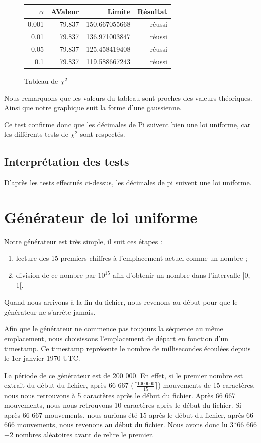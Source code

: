 \documentclass[10pt,a4paper]{article}
\begin{document}
\begin{figure}[h]
		\centering
\begin{tabular}{|r|r|r|r|}
\hline
$\alpha$ & AValeur & Limite & Résultat\\
\hline
0.001 & 79.837 & 150.667055668 & réussi\\
0.01 & 79.837 & 136.971003847 & réussi\\
0.05 & 79.837 & 125.458419408 & réussi\\
0.1 & 79.837 & 119.588667243 & réussi\\
\hline
\end{tabular}
\caption{Tableau de $\chi^2$}
	\end{figure}
Nous remarquons que les valeurs du tableau sont proches des valeurs théoriques. Ainsi que notre graphique suit la forme d'une gaussienne. 

Ce test confirme donc que les décimales de Pi suivent bien une loi uniforme, car les différents tests de $\chi^2$ sont respectés.

\newpage
\subsection{Interprétation des tests}
D'après les tests effectués ci-dessus, les décimales de pi suivent une loi uniforme.
	
	\newpage
	\section{Générateur de loi uniforme}
	Notre générateur est très simple, il suit ces étapes :
	\begin{enumerate}
		\item lecture des 15 premiers chiffres à l'emplacement actuel comme un nombre ;
		\item division de ce nombre par $10^{15}$ afin d'obtenir un nombre dans l'intervalle [0, 1[.
	\end{enumerate}
	Quand nous arrivons à la fin du fichier, nous revenons au début pour que le générateur ne s'arrête jamais.
	
	Afin que le générateur ne commence pas toujours la séquence au même emplacement, nous choisissons l'emplacement de départ en fonction d'un timestamp.
	Ce timestamp représente le nombre de millisecondes écoulées depuis le 1er janvier 1970 UTC.
	
	La période de ce générateur est de 200 000.
	En effet, si le premier nombre est extrait du début du fichier, après 66 667 ($\lceil\frac{1 000 000}{15}\rceil$) mouvements de 15 caractères, nous nous retrouvons à 5 caractères après le début du fichier.
	Après 66 667 mouvements, nous nous retrouvons 10 caractères après le début du fichier.
	Si après 66 667 mouvements, nous aurions été 15 après le début du fichier, après 66 666 mouvements, nous revenons au début du fichier.
	Nous avons donc lu 3*66 666 +2 nombres aléatoires avant de relire le premier.
	
\end{document}
